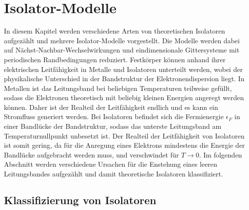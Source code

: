 \chapter{Isolator-Modelle}
\label{ch:isolatormodelle}

In diesem Kapitel werden verschiedene Arten von theoretischen Isolatoren aufgezählt und mehrere Isolator-Modelle vorgestellt.
Die Modelle werden dabei auf Nächst-Nachbar-Wechselwirkungen und eindimensionale Gittersysteme mit periodischen Randbedingungen reduziert.
Festkörper können anhand ihrer elektrischen Leitfähigkeit in Metalle und Isolatoren unterteilt werden,
wobei der physikalische Unterschied in der Bandstruktur der Elektronendispersion liegt.
In Metallen ist das Leitungsband bei beliebigen Temperaturen teilweise gefüllt, sodass die Elektronen theoretisch mit beliebig kleinen Energien angeregt werden können.
Daher ist der Realteil der Leitfähigkeit endlich und es kann ein Stromfluss generiert werden.
Bei Isolatoren befindet sich die Fermienergie $\epsilon_F$ in einer Bandlücke der Bandstruktur, sodass das unterste Leitungsband am Temperaturnullpunkt unbesetzt ist.
Der Realteil der Leitfähigkeit von Isolatoren ist somit gering, da für die Anregung eines Elektrons mindestens die Energie der Bandlücke aufgebracht werden muss,
und verschwindet für $T \to 0$. Im folgenden Abschnitt werden verschiedene Ursachen für die Enstehung eines leeren Leitungsbandes aufgezählt und damit
theoretische Isolatoren klassifiziert. \cite{czycholl,gebhard}

\section{Klassifizierung von Isolatoren}
\label{sec:klassifizierung}

